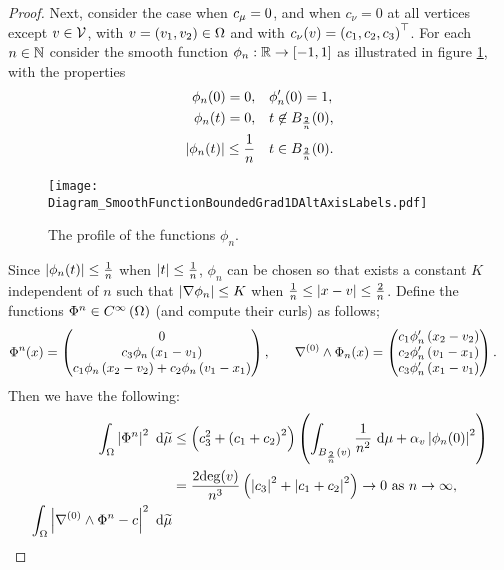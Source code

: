 \begin{proof}
	Next, consider the case when $c_{\mu}=0$, and when $c_{\nu}=0$ at all vertices except $v\in\mathcal{V}$, with $v=\left( v_1, v_2 \right)\in\Omega$ and with $c_{\nu}(v) = \left( c_1, c_2, c_3 \right)^\top$.
	For each $n\in\mathbb{N}$ consider the smooth function $\phi_n:\mathbb{R}\rightarrow\left[ -1,1 \right]$ as illustrated in figure \ref{fig:Diagram_SmoothFunctionBoundedGrad1DAltAxisLabels}, with the properties
	\begin{align*}
		\phi_n(0) = 0,
		&\quad	\phi'_n(0) = 1, \\
		\phi_n(t) = 0, &\quad t\not\in B_{\frac{2}{n}}(0), \\
		\left\lvert \phi_n(t) \right\rvert \leq \frac{1}{n} &\quad t\in B_{\frac{2}{n}}(0).
	\end{align*}
	\begin{figure}[b]
		\centering
		\texttt{[image: Diagram\_SmoothFunctionBoundedGrad1DAltAxisLabels.pdf]}
		\caption{\label{fig:Diagram_SmoothFunctionBoundedGrad1DAltAxisLabels} The profile of the functions $\phi_n$.}
	\end{figure}
	Since $\left\lvert \phi_n(t) \right\rvert \leq \frac{1}{n}$ when $\left\lvert t \right\rvert\leq\frac{1}{n}$, $\phi_n$ can be chosen so that exists a constant $K$ independent of $n$ such that $\left\lvert \nabla\phi_n \right\rvert \leq K$ when $\frac{1}{n} \leq \left\lvert x-v \right\rvert \leq \frac{2}{n}$.
	Define the functions $\Phi^n\in C^{\infty}\left( \Omega \right)$ (and compute their curls) as follows;
	\begin{align*}
		\Phi^n(x) = 
		\begin{pmatrix} 
			0 \\ 
			c_3\phi_n\left( x_1 - v_1 \right) \\ 
			c_1\phi_n\left( x_2-v_2 \right) + c_2\phi_n\left( v_1-x_1 \right) 
		\end{pmatrix},
		&\qquad
		\nabla^{(0)}\wedge\Phi_n(x) =
		\begin{pmatrix}
			c_1\phi'_n\left( x_2-v_2 \right) \\
			c_2\phi'_n\left( v_1-x_1 \right) \\
			c_3\phi'_n\left( x_1-v_1 \right)
		\end{pmatrix}.
	\end{align*}
	Then we have the following:
	\begin{align*}
		\integral{\ddom}{ \abs{ \Phi^n }^2 }{\dddmes}
		&\leq \bracs{c_3^2 + \bracs{c_1 + c_2}^2} \bracs{ \integral{B_{\frac{2}{n}}(v)}{ \recip{n^2} }{\ddmes}
		+ \alpha_v\abs{\phi_n(0)}^2 } \\
		&= \frac{2\mathrm{deg}(v)}{n^3}\bracs{\abs{c_3}^2 + \abs{c_1 + c_2}^2} \rightarrow 0 \toInfty{n}, \\
		\integral{\ddom}{ \abs{ \grad^{(0)}\wedge\Phi^n - c }^2 }{\dddmes}

\end{align*}
\end{proof}
